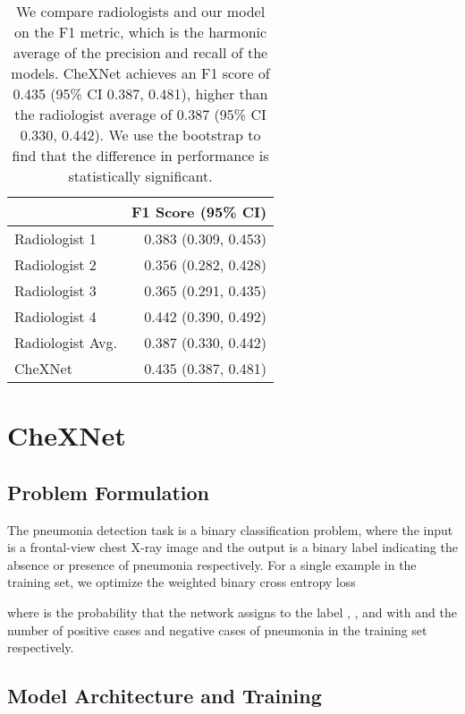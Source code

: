 \documentclass{article}
\begin{document}
 
\begin{table}[t]
  
  \begin{center}
    \begin{tabular}{p{40mm} r}
      \toprule
      & F1 Score (95\% CI)\\
      \midrule
      Radiologist 1 & 0.383 (0.309, 0.453)\\
      Radiologist 2 & 0.356 (0.282, 0.428)\\
      Radiologist 3 & 0.365 (0.291, 0.435)\\
      Radiologist 4 & 0.442 (0.390, 0.492)\\
      \midrule
      Radiologist Avg. & 0.387 (0.330, 0.442)\\
      CheXNet & 0.435 (0.387, 0.481)\\
      \bottomrule
    \end{tabular}
\end{center}
  \caption{We compare radiologists and our model on the F1 metric, which is the harmonic average of the precision and recall of the models. CheXNet achieves an F1 score of 0.435 (95\% CI 0.387, 0.481), higher than the radiologist average of 0.387 (95\% CI 0.330, 0.442). We use the bootstrap to find that the difference in performance is statistically significant.}
  \label{table:test_results}
\end{table}

\section{CheXNet}

\subsection{Problem Formulation}
The pneumonia detection task is a binary classification problem, where the input is a frontal-view chest X-ray image  and the output is a binary label  indicating the absence or presence of pneumonia respectively. For a single example in the training set, we optimize the weighted binary cross entropy loss

where  is the probability that the network assigns to the label , , and  with  and  the number of positive cases and negative cases of pneumonia in the training set respectively.

\subsection{Model Architecture and Training}
\end{document}
